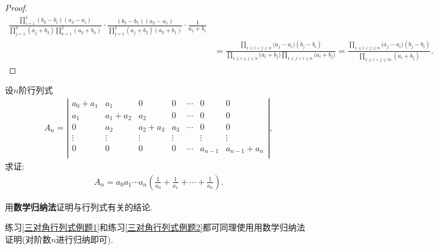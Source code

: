 \documentclass[../../main.tex]{subfiles}%
\begin{document}
\begin{proof}
\begin{align*}
\frac{\prod\limits_{i=1}^2{\left( b_3-b_i \right) \left( a_3-a_i \right)}}{\prod\limits_{j=1}^3{\left( a_j+b_3 \right) \prod\limits_{k=1}^2{\left( a_3+b_k \right)}}}\cdot \frac{\left( b_2-b_1 \right) \left( a_2-a_1 \right)}{\prod\limits_{j=1}^2{\left( a_j+b_2 \right) \left( a_2+b_1 \right)}}\cdot \frac{1}{a_1+b_1}
\\
&=\frac{\prod\limits_{1\leqslant i<j\leqslant n}{(a_j}-a_i)(b_j-b_i)}{\prod\limits_{1\leqslant i\leqslant j\leqslant n}{(a_i}+b_j)\prod\limits_{1\leqslant j<i\leqslant n}{(a_i}+b_j)}=\frac{\prod\limits_{1\leqslant i<j\leqslant n}{(a_j}-a_i)(b_j-b_i)}{\prod\limits_{1\leqslant i<j\leqslant m}{\left( a_i+b_j \right)}}.
\nonumber
\end{align*}
\end{proof}

\begin{example}\label{使用数学归纳法计算行列式例题1}
    设$n$阶行列式
    \begin{align}
    A_n=\left| \begin{matrix}
    a_0+a_1&		a_1&		0&		0&		\cdots&		0&		0\\
    a_1&		a_1+a_2&		a_2&		0&		\cdots&		0&		0\\
    0&		a_2&		a_2+a_3&		a_3&		\cdots&		0&		0\\
    \vdots&		\vdots&		\vdots&		\vdots&		&		\vdots&		\vdots\\
    0&		0&		0&		0&		\cdots&		a_{n-1}&		a_{n-1}+a_n\\
    \end{matrix} \right|,
    \nonumber
    \end{align}
    求证:
    \begin{align}
    A_n=a_0a_1\cdots a_n\left( \frac{1}{a_0}+\frac{1}{a_1}+\cdots +\frac{1}{a_n} \right) .
    \nonumber
    \end{align}
    \end{example}
    \begin{note}
    用\hypertarget{用数学归纳法与行列式有关的结论}{\textbf{数学归纳法}}证明与行列式有关的结论.
    
    练习\ref{三对角行列式例题1}和练习\ref{三对角行列式例题2}都可同理使用用数学归纳法证明(对阶数$n$进行归纳即可).
    \end{note}
\end{document}

